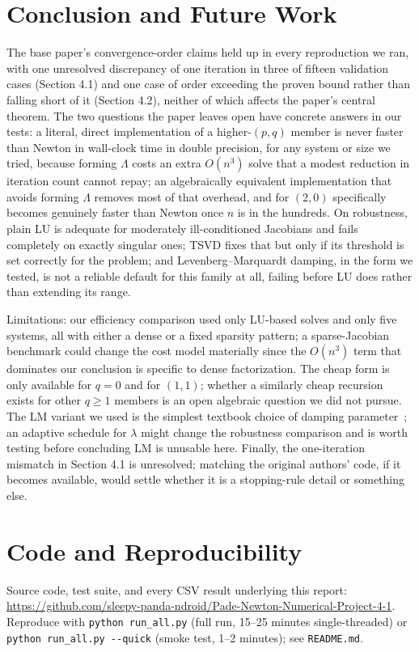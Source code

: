 \documentclass[sigconf,nonacm]{acmart}
\begin{document}
\section{Conclusion and Future Work}

The base paper's convergence-order claims held up in every reproduction we ran, with one
unresolved discrepancy of one iteration in three of fifteen validation cases (Section 4.1) and
one case of order exceeding the proven bound rather than falling short of it (Section 4.2),
neither of which affects the paper's central theorem. The two questions the paper leaves open
have concrete answers in our tests: a literal, direct implementation of a higher-$(p,q)$ member
is never faster than Newton in wall-clock time in double precision, for any system or size we
tried, because forming $\Lambda$ costs an extra $O(n^3)$ solve that a modest reduction in
iteration count cannot repay; an algebraically equivalent implementation that avoids forming
$\Lambda$ removes most of that overhead, and for $(2,0)$ specifically becomes genuinely faster
than Newton once $n$ is in the hundreds. On robustness, plain LU is adequate for moderately
ill-conditioned Jacobians and fails completely on exactly singular ones; TSVD fixes that but only
if its threshold is set correctly for the problem; and Levenberg--Marquardt damping, in the form
we tested, is not a reliable default for this family at all, failing before LU does rather than
extending its range.

Limitations: our efficiency comparison used only LU-based solves and only five systems, all with
either a dense or a fixed sparsity pattern; a sparse-Jacobian benchmark could change the cost
model materially since the $O(n^3)$ term that dominates our conclusion is specific to dense
factorization. The cheap form is only available for $q=0$ and for $(1,1)$; whether a similarly
cheap recursion exists for other $q\ge1$ members is an open algebraic question we did not
pursue. The LM variant we used is the simplest textbook choice
of damping parameter~\cite{levenberg1944,marquardt1963}; an adaptive schedule for $\lambda$
might change the robustness comparison and is worth testing before concluding LM is unusable
here. Finally, the one-iteration mismatch in Section 4.1 is unresolved; matching the original
authors' code, if it becomes available, would settle whether it is a stopping-rule detail or
something else.

\section*{Code and Reproducibility}
Source code, test suite, and every CSV result underlying this report:
\url{https://github.com/sleepy-panda-ndroid/Pade-Newton-Numerical-Project-4-1}.
Reproduce with \texttt{python run\_all.py} (full run,
15--25 minutes single-threaded) or \texttt{python run\_all.py~-\/-quick} (smoke test, 1--2
minutes); see \texttt{README.md}.



\end{document}

